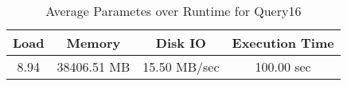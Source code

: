\documentclass[../../main.tex]{subfiles}
\begin{document}
\begin{minipage}{.5\textwidth}
    \end{minipage}
    \begin{table}
        \begin{center}
            \begin{tabular}{ |c|c|c|c| } 
            \hline
            Load & Memory & Disk IO & Execution Time\\
            \hline
            8.94 & 38406.51 MB & 15.50 MB/sec & 100.00 sec \\
            \hline
            \end{tabular}
            \\[1pt]
            \caption{Average Parametes over Runtime for Query16}
        \end{center}
    \end{table}
    \pagebreak
\end{document}

